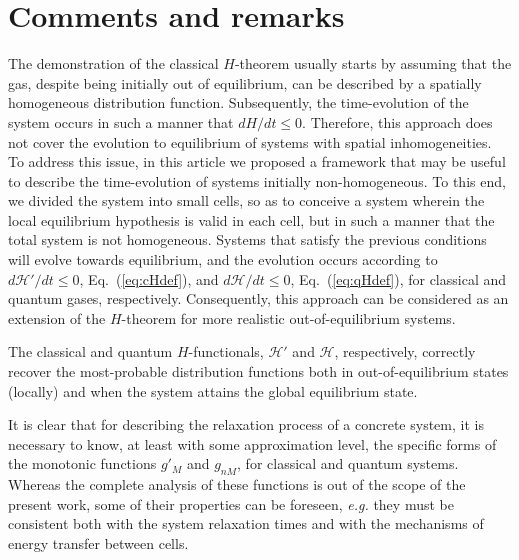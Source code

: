 
\section{Comments and remarks}\label{sec:disscussion}

The demonstration of the classical $H$-theorem usually starts by assuming that the gas,
despite being initially out of equilibrium, can be described by a
spatially homogeneous distribution function. 
Subsequently, the time-evolution of the system occurs in such a manner that $dH/dt \leq 0$. 
Therefore, this approach does not cover the evolution to equilibrium of systems with spatial inhomogeneities.
To address this issue, in this article we
proposed a framework that may be useful to describe the time-evolution of systems
initially non-homogeneous. To this end, we divided the
system into small cells, so as to conceive a system wherein the local equilibrium
hypothesis is valid in each cell, but in such a manner that the total system is not homogeneous. Systems
that satisfy the previous conditions will evolve towards equilibrium, and the evolution
occurs according to $d\mathcal{H}'/dt\leq0$, Eq.~(\ref{eq:cHdef}),
and $d\mathcal{H}/dt\leq0$, Eq.~(\ref{eq:qHdef}), for classical and quantum gases, respectively.
Consequently, this approach can be considered as an extension of the $H$-theorem
for more realistic out-of-equilibrium systems.

The classical and quantum $H$-functionals, $\mathcal{H}'$ and $\mathcal{H}$, respectively,
correctly recover the most-probable distribution
functions both in out-of-equilibrium states (locally) and when the system attains the global
equilibrium state. 

It is clear that for describing the relaxation process of a concrete system,
it is necessary to know, at least with some approximation level, the specific forms of the
monotonic functions $g'_M$ and $g_{nM}$, for classical and quantum systems.
Whereas the complete analysis of these functions is out of the scope of the present work,
some of their properties can be foreseen, \textit{e.g.} they must
be consistent both with the system relaxation times and with the mechanisms of 
energy transfer between cells.

